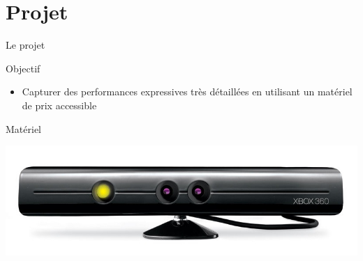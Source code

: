 \documentclass[compress,pdf,11pt,xcolor=dvipsnames]{beamer}
\begin{document}
\section{Projet}
\begin{frame}{Le projet}
  \begin{block}{Objectif}
    \begin{itemize}
    \item Capturer des performances expressives très
      détaillées en utilisant un matériel de prix accessible
    \end{itemize}
  \end{block}

  \begin{bkblock}{Matériel}
    \begin{center}
      \includegraphics[scale=0.2]{img/kinect}
    \end{center}
  \end{bkblock}


\end{frame}
\end{document}
